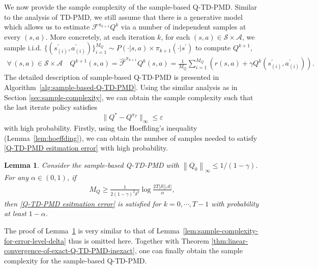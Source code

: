 \documentclass[10pt]{article}
\newcommand{\calA}{\mathcal{A}}
\newcommand{\calS}{\mathcal{S}}
\newcommand{\ls}{\left}
\newcommand{\rs}{\right}
\theoremstyle{plain}
\newtheorem{lemma}[theorem]{Lemma}
\theoremstyle{definition}
\begin{document}
We now provide the sample complexity of the sample-based Q-TD-PMD. Similar to the analysis of TD-PMD, we still assume that there is a generative model which allows us to estimate $\mathcal{F}^{\pi_{k+1}}Q^k$ via a number of independent samples at every $(s,a)$. More concretely, at each iteration $k$, for each $(s,a) \in \calS\times\calA$, we sample i.i.d. $\{ (s^\prime_{(i)},a^\prime_{(i)}) \}_{i=1}^{M_Q} \sim P(\cdot|s,a)\times \pi_{k+1}(\cdot|s^\prime)$ to compute $Q^{k+1}$,
\begin{align*}
\forall \,(s,a)\in \mathcal{S} \times \mathcal{A} \quad Q^{k+1}\left( s,a \right) =\hat{\mathcal{F}}^{\pi _{k+1}}Q^k(s,a)=\frac{1}{M_Q}\sum\nolimits_{i=1}^{M_Q}{\left( r\left( s,a \right) +\gamma Q^k\left( s_{\left( i \right)}^{\prime},a_{\left( i \right)}^{\prime} \right) \right)}.
\end{align*}
The detailed  description of sample-based Q-TD-PMD is presented in Algorithm~\ref{alg:sample-based-Q-TD-PMD}. Using the similar analysis as in Section \ref{sec:sample-complexity}, we can obtain the sample complexity such that the last iterate policy satisfies
\[\| Q^*-Q^{\pi _T}\| _{\infty}\le \varepsilon \]
with high probability. Firstly, using the Hoeffding’s inequality (Lemma~\ref{lem:hoeffding}), we can obtain the number of samples needed to satisfy \eqref{Q-TD-PMD esitmation error} with high probability.

\begin{lemma} 
\label{lem:sample-complexity-for-error-level-delta-Q-TD-PMD}
Consider the sample-based Q-TD-PMD with  $\ls\| Q_0 \rs\|_\infty \leq {1}/{(1-\gamma)}$. For any $\alpha \in (0,1)$, if 
\begin{align*}M_Q \geq \frac{1}{2(1-\gamma)^2 \delta^2} \log \frac{2T|\calS||\calA|}{\alpha},\end{align*} then \eqref{Q-TD-PMD esitmation error} is satisfied for $k=0,\cdots,T-1$ with  probability at least $1-\alpha$.
\end{lemma}

The proof of Lemma~\ref{lem:sample-complexity-for-error-level-delta-Q-TD-PMD} is very similar to that of Lemma~\ref{lem:sample-complexity-for-error-level-delta} thus is omitted here.  Together with Theorem \ref{thm:linear-convergence-of-exact-Q-TD-PMD-inexact}, one can finally obtain the sample complexity for the sample-based Q-TD-PMD.
\end{document}
